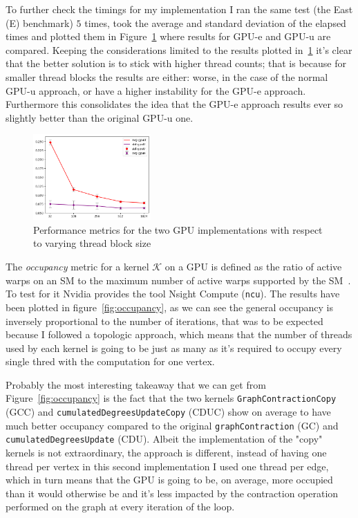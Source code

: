 \documentclass[a4paper,10pt]{article}
\begin{document}
To further check the timings for my implementation I ran the same test (the East (E) benchmark) $5$ times, took the average and standard deviation of the elapsed times and plotted them in Figure~\ref{fig:avg-std-timings} where results for GPU-e and GPU-u are compared. Keeping the considerations limited to the results plotted in~\ref{fig:avg-std-timings} it's clear that the better solution is to stick with higher thread counts; that is because for smaller thread blocks the results are either: worse, in the case of the normal GPU-u approach, or have a higher instability for the GPU-e approach. Furthermore this consolidates the idea that the GPU-e approach results ever so slightly better than the original GPU-u one.
\begin{figure}
	\centering
	\includegraphics[width=0.4\textwidth]{fig/timings.png}
	\caption{Performance metrics for the two GPU implementations with respect to varying thread block size}
	\label{fig:avg-std-timings}
\end{figure}
The \emph{occupancy} metric for a kernel $\mathcal{K}$ on a GPU is defined as the ratio of active warps on an SM to the maximum number of active warps supported by the SM~\cite{def-occupancy}. To test for it Nvidia provides the tool Nsight Compute (\texttt{ncu}). The results have been plotted in figure~\ref{fig:occupancy}, as we can see the general occupancy is inversely proportional to the number of iterations, that was to be expected because I followed a topologic approach, which means that the number of threads used by each kernel is going to be just as many as it's required to occupy every single thred with the computation for one vertex.

Probably the most interesting takeaway that we can get from Figure~\ref{fig:occupancy} is the fact that the two kernels \texttt{GraphContractionCopy} (GCC) and \texttt{cumulatedDegreesUpdateCopy} (CDUC) show on average to have much better occupancy compared to the original \texttt{graphContraction} (GC) and \texttt{cumulatedDegreesUpdate} (CDU). Albeit the implementation of the "copy" kernels is not extraordinary, the approach is different, instead of having one thread per vertex in this second implementation I used one thread per edge, which in turn means that the GPU is going to be, on average, more occupied than it would otherwise be and it's less impacted by the contraction operation performed on the graph at every iteration of the loop.
\end{document}
